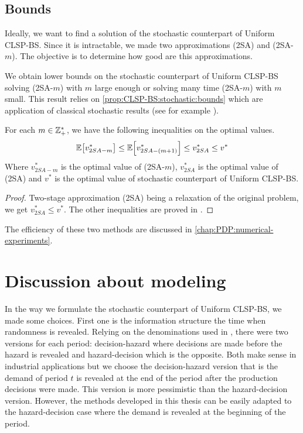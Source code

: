 


\subsection{Bounds}


Ideally, we want to find a solution of the stochastic counterpart of Uniform CLSP-BS.
Since it is intractable, we made two approximations (2SA) and (2SA-$m$).
The objective is to determine how good are this approximations.


We obtain lower bounds on the stochastic counterpart of Uniform CLSP-BS solving (2SA-$m$) with $m$ large enough or solving many time (2SA-$m$) with $m$ small.
This result relies on \cref{prop:CLSP-BS:stochastic:bounds} which are application of classical stochastic results (see for example \cite{Shapiro2009}).

\begin{prop}\label{prop:CLSP-BS:stochastic:bounds}
For each $m\in\mathbb{Z}_+^*$, we have the following inequalities on the optimal values.
\begin{equation}
  \espe\sqbracket{v^*_{2SA-m}}
  \le\espe\sqbracket{v^*_{2SA-(m+1)}}
  \le v^*_{2SA}
  \le v^*
\end{equation}
Where $v^*_{2SA-m}$ is the optimal value of (2SA-$m$), $v^*_{2SA}$ is the optimal value of (2SA) and $v^*$ is the optimal value of stochastic counterpart of Uniform CLSP-BS.
\end{prop}


\begin{proof}
Two-stage approximation (2SA) being a relaxation of the original problem, we get $v^*_{2SA} \le v^*$. The other inequalities are proved in \cite[Proposition 5.6]{Shapiro2009}.
\end{proof}


The efficiency of these two methods are discussed in \cref{chap:PDP:numerical-experiments}.



\section{Discussion about modeling}
\label{sec:stoch-CLSP-BS-discussion}

In the way we formulate the stochastic counterpart of Uniform CLSP-BS, we made some choices.
First one is the information structure \ie the time when randomness is revealed.
Relying on the denominations used in \cite{Carpentier2015}, there were two versions for each period: decision-hazard where decisions are made before the hazard is revealed and hazard-decision which is the opposite.
Both make sense in industrial applications but we choose the decision-hazard version that is the demand of period $t$ is revealed at the end of the period after the production decisions were made.
This version is more pessimistic than the hazard-decision version.
However, the methods developed in this thesis can be easily adapted to the hazard-decision case where the demand is revealed at the beginning of the period.



